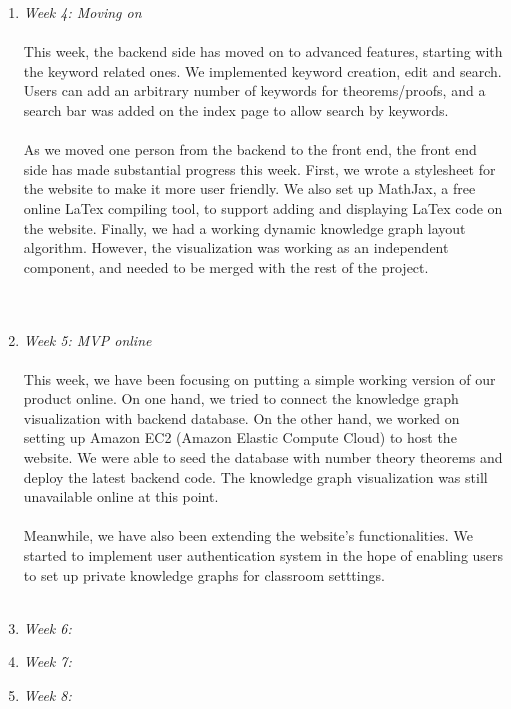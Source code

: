 \documentclass{acm_proc_article-sp}
\begin{document}
\begin{enumerate}
\item \emph{Week 4: Moving on}\\\\
This week, the backend side has moved on to advanced features, starting with the keyword related ones. We implemented keyword creation, edit and search. Users can add an arbitrary number of keywords for theorems/proofs, and a search bar was added on the index page to allow search by keywords.\\\\
As we moved one person from the backend to the front end, the front end side has made substantial progress this week. First, we wrote a stylesheet for the website to make it more user friendly. We also set up MathJax, a free online LaTex compiling tool, to support adding and displaying LaTex code on the website. Finally, we had a working dynamic knowledge graph layout algorithm. However, the visualization was working as an independent component, and needed to be merged with the rest of the project.\\\\
\\

\item \emph{Week 5:  MVP online}\\\\
This week, we have been focusing on putting a simple working version of our product online. On one hand, we tried to connect the knowledge graph visualization with backend database. On the other hand, we worked on setting up Amazon EC2 (Amazon Elastic Compute Cloud) to host the website. We were able to seed the database with number theory theorems and deploy the latest backend code. The knowledge graph visualization was still unavailable online at this point. \\\\
Meanwhile, we have also been extending the website's functionalities. We started to implement user authentication system in the hope of enabling users to set up private knowledge graphs for classroom setttings.\\\\


\item \emph{Week 6: }\\



\item \emph{Week 7:  }\\

\item \emph{Week 8: }\\

\end{enumerate}
\end{document}

